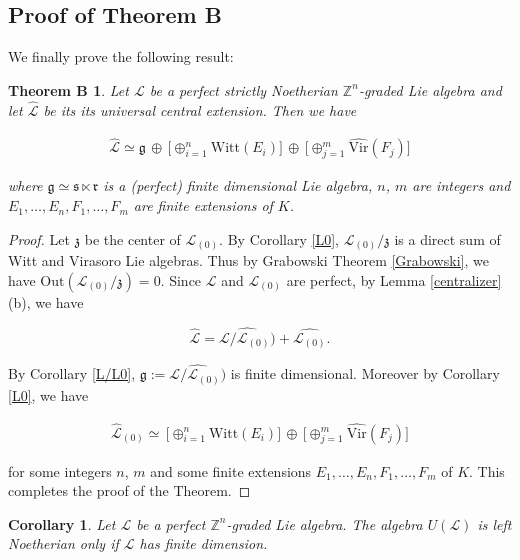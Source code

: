 \documentclass[11pt, letterpaper, reqno]{amsart}
\newtheorem*{mainB}{Theorem B}
\newtheorem{cor}[theorem]{Corollary}
\theoremstyle{definition}
\newcommand{\Z}{{\mathbb Z}}
\newcommand{\cL}{\mathcal L}
\newcommand{\fg}{\mathfrak{g}}
\newcommand{\fr}{\mathfrak{r}}
\newcommand{\fs}{\mathfrak{s}}
\newcommand{\fz}{\mathfrak{z}}
\newcommand{\Out}{\mathrm{Out}}
\newcommand{\Vir}{\mathrm{Vir}}
\newcommand{\Witt}{\mathrm{Witt}}
\begin{document}
\subsection{Proof of Theorem B}


We finally prove  the following result:


\begin{mainB}
Let $\cL$ be a perfect strictly Noetherian
$\Z^n$-graded Lie algebra
and let $\widehat{\cL}$ be its its universal central extension. Then we have

\begin{align*}
\widehat{\cL}\simeq \fg\,\oplus 
\,\big[\oplus_{i=1}^n\Witt(E_i)\big]\,\oplus 
\,\big[\oplus_{j=1}^m\widehat{\Vir}(F_j)\big]
\end{align*}

\noindent where $\fg\simeq \fs\ltimes\fr$ is a  (perfect) finite dimensional Lie algebra,
$n$, $m$ are integers and 
$E_1,\ldots,E_n,F_1,\ldots, F_m$ are finite extensions of $K$.
\end{mainB}


\begin{proof} Let
$\fz$ be the center of $\cL_{(0)}$.
By Corollary \ref{L0},  $\cL_{(0)}/\fz$ is a direct sum 
of Witt and Virasoro Lie algebras. Thus by
Grabowski Theorem \ref{Grabowski}, we have
$\Out(\cL_{(0)}/\fz)=0$. Since $\cL$ and $\cL_{(0)}$ are perfect,
by Lemma \ref{centralizer}(b),
we have

$$\widehat{\cL}=\widehat{\cL/\cL_{(0)})}+\widehat{\cL_{(0)}}.$$

\noindent By Corollary \ref{L/L0}, 
$\fg:=\widehat{\cL/\cL_{(0)})}$ is finite dimensional.
  Moreover by Corollary \ref{L0}, we have

 \begin{align*}
\widehat{\cL}_{(0)}\simeq 
\,\big[\oplus_{i=1}^n\Witt(E_i)\big]\,\oplus 
\,\big[\oplus_{j=1}^m\widehat{\Vir}(F_j)\big]
\end{align*}

\noindent for some integers
$n$, $m$  and some finite extensions
$E_1,\ldots,E_n,F_1,\ldots, F_m$  of $K$. This completes the proof of the Theorem.
\end{proof}




\begin{cor}\label{SW}
Let $\cL$ be a perfect 
$\Z^n$-graded Lie algebra. 
The algebra $U(\cL)$ is left Noetherian
only if $\cL$ has finite dimension.
\end{cor}
\end{document}
